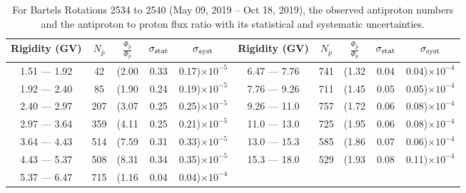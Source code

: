 \begin{table}[p] 
\renewcommand\baselinestretch{1.3}\selectfont
\setlength\tabcolsep{3pt}
\centering
\begin{tabular}{ccccc | ccccc}
\hline
\textbf{Rigidity}  (GV)  & $N_{\bar{p}}$ & $\frac{\Phi_{\bar{p}}}{\Phi_{p}}$ & $\sigma_{\rm{stat}}$ & $\sigma_{\rm{syst}}$ \hspace{1cm}   & \textbf{Rigidity}  (GV)  & $N_{\bar{p}}$ & $\frac{\Phi_{\bar{p}}}{\Phi_{p}}$ & $\sigma_{\rm{stat}}$ & $\sigma_{\rm{syst}}$ \hspace{1cm} \\ 
\hline
1.51 — 1.92   &  42                  &(2.00                          &  0.33              &      0.17)$\times 10^{-5}$  & 6.47 — 7.76                &  741                    &(1.32                               &  0.04                   &      0.04)$\times 10^{-4}$\\
1.92 — 2.40   &  85                  &(1.90                          &  0.24              &      0.19)$\times 10^{-5}$  & 7.76 — 9.26                &  711                    &(1.45                                &  0.05                   &      0.05)$\times 10^{-4}$\\
2.40 — 2.97   &  207                &(3.07                          &  0.25              &      0.25)$\times 10^{-5}$  & 9.26 — 11.0                &  757                    &(1.72                                &  0.06                   &      0.08)$\times 10^{-4}$\\    
2.97 — 3.64   &  359                &(4.11                          &  0.25              &      0.21)$\times 10^{-5}$  & 11.0 — 13.0                 &  725                    &(1.95                                &  0.06                   &      0.08)$\times 10^{-4}$\\    
3.64 — 4.43   &  514                &(7.59                          &  0.31              &      0.33)$\times 10^{-5}$  & 13.0 — 15.3               &  585                    &(1.86                                &  0.07                   &      0.06)$\times 10^{-4}$\\
4.43 — 5.37   &  508                &(8.31                          &  0.34              &      0.35)$\times 10^{-5}$  & 15.3 — 18.0               &  529                    &(1.93                                &  0.08                   &      0.11)$\times 10^{-4}$\\
5.37 — 6.47   &  715                &(1.16                          &  0.04              &      0.04)$\times 10^{-4}$  & \\
\hline
\end{tabular}
\caption[Antiproton to proton flux ratio for Bartels Rotations 2534 to 2540]{For Bartels Rotations 2534 to 2540 (May 09, 2019 – Oct 18, 2019), the observed antiproton numbers and the antiproton to proton flux ratio with its statistical and systematic uncertainties.}
\label{TableOfDependent19}
\end{table}

